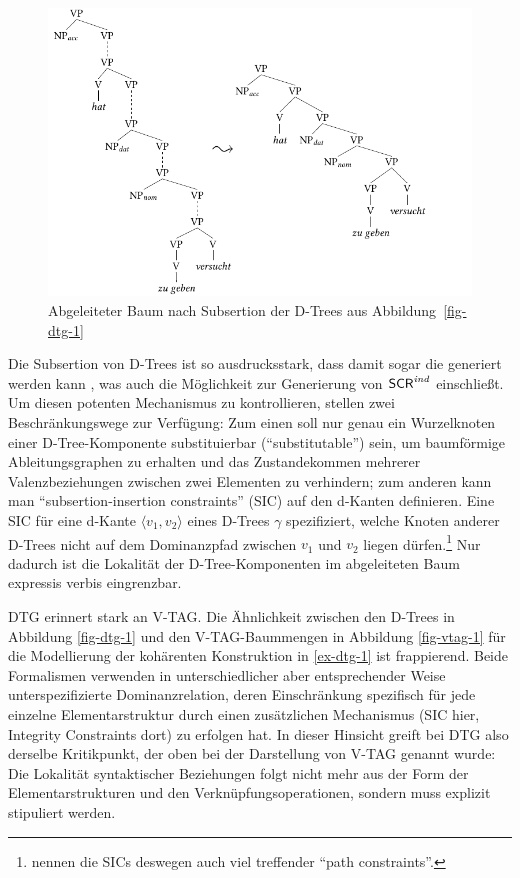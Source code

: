 \begin{figure}[t]
\centering
\includegraphics{graphics/abb610.pdf}
\caption{\label{fig-dtg-2}Abgeleiteter Baum nach Subsertion der D-Trees aus Abbildung~\ref{fig-dtg-1}}
\end{figure}

Die Subsertion von D-Trees ist so ausdrucksstark, dass damit sogar die  generiert werden kann \citep[Abb.~13]{Rambow:etal:01}, was auch die Möglichkeit zur Generierung von $\mathsf{SCR}^{\mathit{ind}}$ einschlie\ss t. Um diesen potenten Mechanismus zu kontrollieren, stellen \cite{Rambow:etal:95} zwei Beschränkungswege zur Verfügung: Zum einen soll nur genau ein Wurzelknoten einer D-Tree-Komponente substituierbar ("`substitutable"') sein, um baumförmige Ableitungsgraphen zu erhalten und das Zustandekommen mehrerer Valenzbeziehungen zwischen zwei Elementen zu verhindern; zum anderen kann man "`subsertion-insertion constraints"' (SIC) auf den d-Kanten definieren. Eine SIC für eine d-Kante $\langle v_1,v_2 \rangle$ eines D-Trees $\gamma$ spezifiziert, welche Knoten anderer D-Trees nicht auf dem Dominanzpfad zwischen $v_1$ und $v_2$ liegen dürfen.\footnote{\cite{Rambow:etal:01} nennen die SICs deswegen auch viel treffender "`path constraints"'.} Nur dadurch ist die Lokalität der D-Tree-Komponenten im abgeleiteten Baum expressis verbis eingrenzbar.

\largerpage
DTG erinnert stark an V-TAG. Die Ähnlichkeit zwischen den D-Trees in Abbildung \ref{fig-dtg-1} und den V-TAG-Baummengen in Abbildung \ref{fig-vtag-1} für die Modellierung der kohärenten Konstruktion in \ref{ex-dtg-1} ist frappierend. Beide Formalismen verwenden in unterschiedlicher aber entsprechender Weise unterspezifizierte Dominanzrelation, deren Einschränkung spezifisch für jede einzelne Elementarstruktur durch einen zusätzlichen Mechanismus (SIC hier, Integrity Constraints dort) zu erfolgen hat. In dieser Hinsicht greift bei DTG also derselbe Kritikpunkt, der oben bei der Darstellung von V-TAG genannt wurde: Die Lokalität syntaktischer Beziehungen folgt nicht mehr aus der Form der Elementarstrukturen und den Verknüpfungsoperationen, sondern muss explizit stipuliert werden.  


